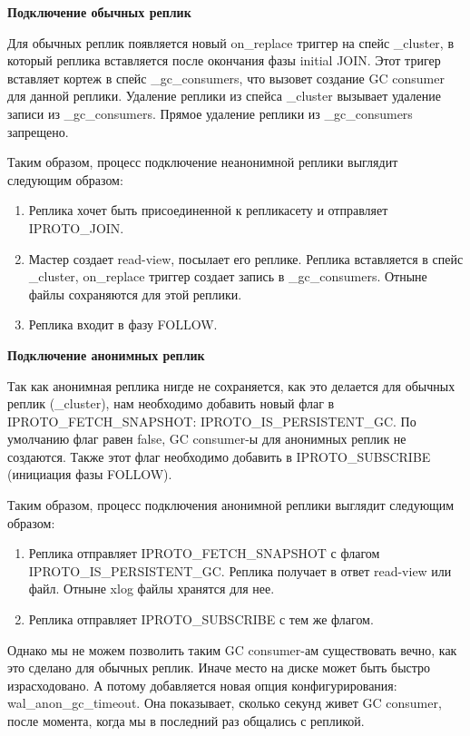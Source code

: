 \textbf{Подключение обычных реплик}

Для обычных реплик появляется новый on\_replace триггер на спейс \_cluster, в который реплика вставляется после окончания фазы initial JOIN. Этот тригер вставляет кортеж в спейс \_gc\_consumers, что вызовет создание GC consumer для данной реплики. Удаление реплики из спейса \_cluster вызывает удаление записи из \_gc\_consumers. Прямое удаление реплики из \_gc\_consumers запрещено.

Таким образом, процесс подключение неанонимной реплики выглядит следующим образом:

\begin{enumerate}
    \item Реплика хочет быть присоединенной к репликасету и отправляет IPROTO\_JOIN.
    \item Мастер создает read-view, посылает его реплике. Реплика вставляется в спейс \_cluster, on\_replace триггер создает запись в \_gc\_consumers. Отныне файлы сохраняются для этой реплики.
    \item Реплика входит в фазу FOLLOW.
\end{enumerate}

\textbf{Подключение анонимных реплик}

Так как анонимная реплика нигде не сохраняется, как это делается для обычных реплик (\_cluster), нам необходимо добавить новый флаг в IPROTO\_FETCH\_SNAPSHOT: IPROTO\_IS\_PERSISTENT\_GC. По умолчанию флаг равен false, GC consumer-ы для анонимных реплик не создаются. Также этот флаг необходимо добавить в IPROTO\_SUBSCRIBE (инициация фазы FOLLOW).

Таким образом, процесс подключения анонимной реплики выглядит следующим образом:

\begin{enumerate}
    \item Реплика отправляет IPROTO\_FETCH\_SNAPSHOT с флагом IPROTO\_IS\_PERSISTENT\_GC. Реплика получает в ответ read-view или файл. Отныне xlog файлы хранятся для нее.
    \item Реплика отправляет IPROTO\_SUBSCRIBE с тем же флагом.
\end{enumerate}

Однако мы не можем позволить таким GC consumer-ам существовать вечно, как это сделано для обычных реплик. Иначе место на диске может быть быстро израсходовано. А потому добавляется новая опция конфигурирования: wal\_anon\_gc\_timeout. Она показывает, сколько секунд живет GC consumer, после момента, когда мы в последний раз общались с репликой.
